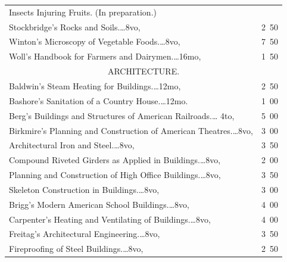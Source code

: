 \documentclass[a4paper,12pt]{book}[2004/02/16]
\theoremstyle{ilemma}
\theoremstyle{itheorem}
\theoremstyle{iother}
\theoremstyle{icorollary}
\theoremstyle{numcorollary}
\theoremstyle{idefinition}
\begin{document}
\begin{longtable}{@{}l@{ }r@{}}
\indent Insects Injuring Fruits. (In preparation.)\\

Stockbridge's Rocks and Soils.\dotfill\ldots 8vo, &2\ 50\\

Winton's Microscopy of Vegetable Foods.\dotfill\ldots 8vo, &7\ 50\\

Woll's Handbook for Farmers and Dairymen.\dotfill\ldots 16mo, &1\ 50\\[3em]

\multicolumn{2}{c}{\large ARCHITECTURE.}\\[1em]
\nopagebreak
Baldwin's Steam Heating for Buildings.\dotfill\ldots 12mo, &2\ 50\\

Bashore's Sanitation of a Country House.\dotfill\ldots 12mo. &1\ 00\\

Berg's Buildings and Structures of American Railroads.\dotfill\ldots
4to, &5\ 00\\

Birkmire's Planning and Construction of American
Theatres.\dotfill\ldots 8vo, &3\ 00\\

\indent Architectural Iron and Steel.\dotfill\ldots 8vo, &3\ 50\\

\indent Compound Riveted Girders as Applied in
Buildings.\dotfill\ldots 8vo, &2\ 00\\

\indent Planning and Construction of High Office
Buildings.\dotfill\ldots 8vo, &3\ 50\\

\indent Skeleton Construction in Buildings.\dotfill\ldots 8vo, &3\ 00\\

Brigg's Modern American School Buildings.\dotfill\ldots 8vo, &4\ 00\\

Carpenter's Heating and Ventilating of Buildings.\dotfill\ldots 8vo,
&4\ 00\\

Freitag's Architectural Engineering.\dotfill\ldots 8vo, &3\ 50\\

\nopagebreak
\indent Fireproofing of Steel Buildings.\dotfill\ldots 8vo, &2\ 50\\


\end{longtable}
\end{document}
